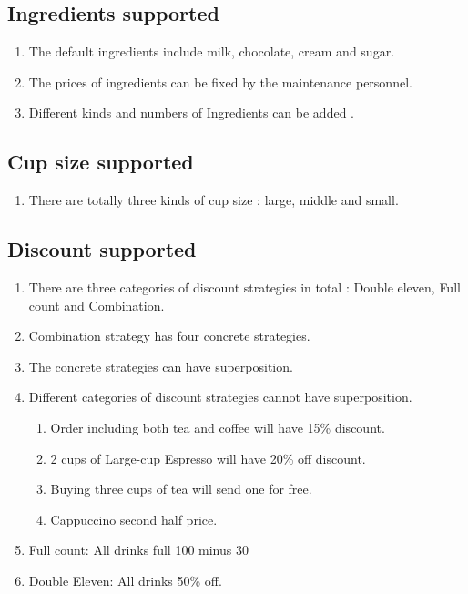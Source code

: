 \documentclass[a4paper]{report}
\begin{document}
\subsection{Ingredients supported}
\begin{enumerate}
\item The default ingredients include milk, chocolate, cream and sugar.
\item The prices of ingredients can be fixed by the maintenance personnel.
\item Different kinds and numbers of Ingredients can be added .
\end{enumerate}

\subsection{Cup size supported}
\begin{enumerate}
\item There are totally three kinds of cup size : large, middle and small.
\end{enumerate}

\subsection{Discount supported}
\begin{enumerate}
\item There are three categories of discount strategies in total : Double eleven, Full count and Combination.
\item Combination strategy has four concrete strategies.
\item The concrete strategies can have superposition.
\item Different categories of discount strategies cannot have superposition.
\begin{enumerate}
\item Order including both tea and coffee will have 15\% discount.
\item 2 cups of Large-cup Espresso will have 20\% off discount.
\item Buying three cups of tea will send one for free.
\item Cappuccino second half price.
\end{enumerate}
\item Full count: All drinks full 100 minus 30
\item Double Eleven: All drinks 50\% off.
\end{enumerate}
\end{document}
